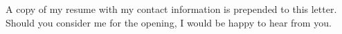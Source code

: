 A copy of my resume with my contact information is prepended to this letter. 
Should you consider me for the \position{} opening, 
I would be happy to hear from you. 